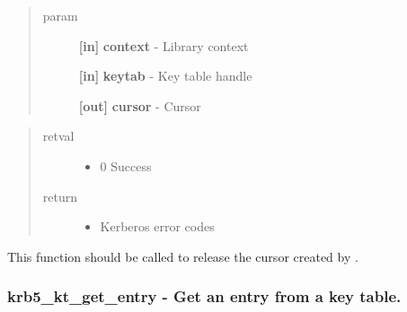 \documentclass[letterpaper,10pt,english]{sphinxmanual}
\begin{document}
\begin{fulllineitems}
\label{appdev/refs/api/krb5_kt_end_seq_get:c.krb5_kt_end_seq_get}
\end{fulllineitems}

\begin{quote}\begin{description}
\item[{param}] \leavevmode
\textbf{{[}in{]}} \textbf{context} - Library context

\textbf{{[}in{]}} \textbf{keytab} - Key table handle

\textbf{{[}out{]}} \textbf{cursor} - Cursor

\end{description}\end{quote}
\begin{quote}\begin{description}
\item[{retval}] \leavevmode\begin{itemize}
\item {} 
0   Success

\end{itemize}

\item[{return}] \leavevmode\begin{itemize}
\item {} 
Kerberos error codes

\end{itemize}

\end{description}\end{quote}

This function should be called to release the cursor created by {\hyperref[appdev/refs/api/krb5_kt_start_seq_get:c.krb5_kt_start_seq_get]{}} .


\subsubsection{krb5\_kt\_get\_entry -  Get an entry from a key table.}
\label{appdev/refs/api/krb5_kt_get_entry:krb5-kt-get-entry-get-an-entry-from-a-key-table}\label{appdev/refs/api/krb5_kt_get_entry::doc}
\end{document}
